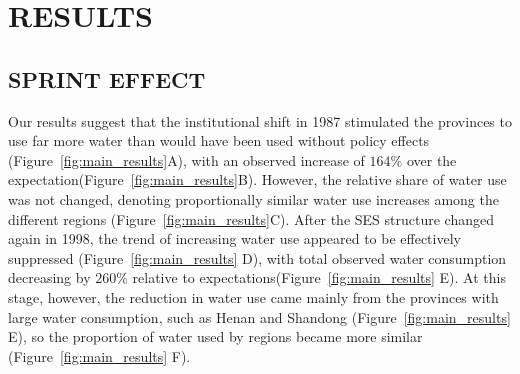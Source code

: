 \documentclass{nsr}
\begin{document}
\section{RESULTS}\label{results}
\subsection{SPRINT EFFECT}\label{phenomenon}

Our results suggest that the institutional shift in 1987 stimulated the provinces to use far more water than would have been used without policy effects (Figure~\ref{fig:main_results}A), with an observed increase of $164\%$ over the expectation(Figure~\ref{fig:main_results}B).
However, the relative share of water use was not changed, denoting proportionally similar water use increases among the different regions (Figure~\ref{fig:main_results}C).
After the SES structure changed again in 1998, the trend of increasing water use appeared to be effectively suppressed (Figure~\ref{fig:main_results} D), with total observed water consumption decreasing by $260\%$ relative to expectations(Figure~\ref{fig:main_results} E).
At this stage, however, the reduction in water use came mainly from the provinces with large water consumption, such as Henan and Shandong (Figure~\ref{fig:main_results} E),  so the proportion of water used by regions became more similar (Figure~\ref{fig:main_results} F).
\end{document}
